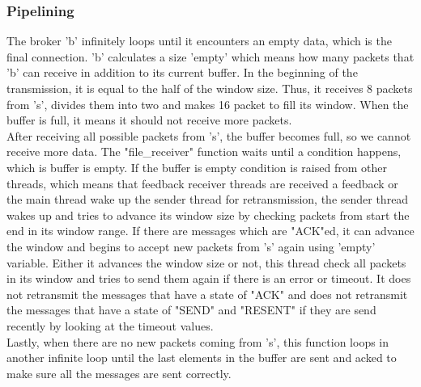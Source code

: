 \documentclass[12pt,journal,compsoc]{IEEEtran}
\begin{document}
\subsubsection{Pipelining}
The broker 'b' infinitely loops until it encounters an empty data, which is the final connection. 'b' calculates a size 'empty' which means how many packets that 'b' can receive in addition to its current buffer. In the beginning of the transmission, it is equal to the half of the window size. Thus, it receives 8 packets from 's', divides them into two and makes 16 packet to fill its window. When the buffer is full, it means it should not receive more packets.\\
After receiving all possible packets from 's', the buffer becomes full, so we cannot receive more data. The "file\_receiver" function waits until a condition happens, which is buffer is empty. If the buffer is empty condition is raised from other threads, which means that feedback receiver threads are received a feedback or the main thread wake up the sender thread for retransmission, the sender thread wakes up and tries to advance its window size by checking packets from start the end in its window range. If there are messages which are "ACK"ed, it can advance the window and begins to accept new packets from 's' again using 'empty' variable. Either it advances the window size or not, this thread check all packets in its window and tries to send them again if there is an error or timeout. It does not retransmit the messages that have a state of "ACK" and does not retransmit the messages that have a state of "SEND" and "RESENT" if they are send recently by looking at the timeout values.\\
Lastly, when there are no new packets coming from 's', this function loops in another infinite loop until the last elements in the buffer are sent and acked to make sure all the messages are sent correctly.\\
\end{document}
